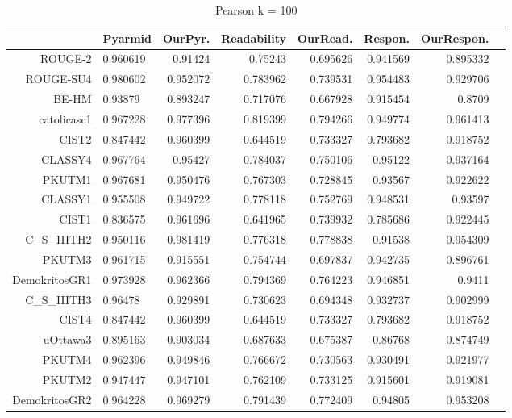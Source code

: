 \begin{table}[h]
\tiny    
    \centering
    \caption{ Pearson k = 100}
    \begin{tabular}{rlrrrrrr}
    \hline
          & \multicolumn{1}{l}{Pyarmid} & \multicolumn{1}{l}{OurPyr.} & \multicolumn{1}{l}{Readability} & \multicolumn{1}{l}{OurRead.} & \multicolumn{1}{l}{Respon.} & \multicolumn{1}{l}{OurRespon.} \\
    \hline
    ROUGE-2        & 0.960619 & 0.91424 & 0.75243 & 0.695626 & 0.941569 & 0.895332 \\
    ROUGE-SU4       & 0.980602 & 0.952072 & 0.783962 & 0.739531 & 0.954483 & 0.929706 \\
    BE-HM           & 0.93879 & 0.893247 & 0.717076 & 0.667928 & 0.915454 & 0.8709 \\
    catolicasc1     & 0.967228 & 0.977396 & 0.819399 & 0.794266 & 0.949774 & 0.961413 \\
    CIST2          & 0.847442 & 0.960399 & 0.644519 & 0.733327 & 0.793682 & 0.918752 \\
    CLASSY4         & 0.967764 & 0.95427 & 0.784037 & 0.750106 & 0.95122 & 0.937164 \\
    PKUTM1 & 0.967681 & 0.950476 & 0.767303 & 0.728845 & 0.93567 & 0.922622 \\
    CLASSY1 & 0.955508 & 0.949722 & 0.778118 & 0.752769 & 0.948531 & 0.93597 \\
    CIST1 & 0.836575 & 0.961696 & 0.641965 & 0.739932 & 0.785686 & 0.922445 \\
    C\_S\_IIITH2 & 0.950116 & 0.981419 & 0.776318 & 0.778838 & 0.91538 & 0.954309 \\
    PKUTM3 & 0.961715 & 0.915551 & 0.754744 & 0.697837 & 0.942735 & 0.896761 \\
    DemokritosGR1 & 0.973928 & 0.962366 & 0.794369 & 0.764223 & 0.946851 & 0.9411 \\
    C\_S\_IIITH3 & 0.96478 & 0.929891 & 0.730623 & 0.694348 & 0.932737 & 0.902999 \\
    CIST4 & 0.847442 & 0.960399 & 0.644519 & 0.733327 & 0.793682 & 0.918752 \\
    uOttawa3 & 0.895163 & 0.903034 & 0.687633 & 0.675387 & 0.86768 & 0.874749 \\
    PKUTM4 & 0.962396 & 0.949846 & 0.766672 & 0.730563 & 0.930491 & 0.921977 \\
    PKUTM2 & 0.947447 & 0.947101 & 0.762109 & 0.733125 & 0.915601 & 0.919081 \\
    DemokritosGR2 & 0.964228 & 0.969279 & 0.791439 & 0.772409 & 0.94805 & 0.953208 \\

\end{tabular}
\end{table}
